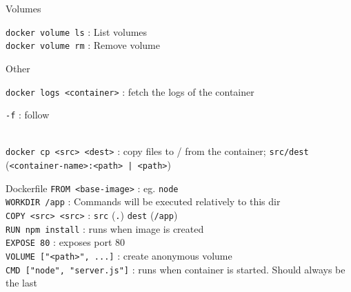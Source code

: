 \documentclass[10pt]{article}
\newcommand{\code}[1]{{\color{teal}\texttt{#1}}}
\newcommand{\cmd}[3][.3]{\code{#2} : #3 \\[#1em]}
\newcommand{\opts}[2][.5]{\hspace*{.5cm}\begin{minipage}{0.9\textwidth}
  #2
  \vspace*{-1em}
\end{minipage}\\[#1em]}
\newcommand{\cluster}[2]{\begin{mybox}{#1}
  #2
  \vspace*{-1.3em}
\end{mybox}}
\begin{document}
\begin{multicols*}{2}
  \cluster{Volumes}{
    \cmd{docker volume ls}{List volumes}
    \cmd{docker volume rm}{Remove volume}
  }

  \cluster{Other}{
    \cmd{docker logs <container>}{fetch the logs of the container}
    \opts{
      \code{-f} : follow \\
    }
    \cmd{docker cp <src> <dest>}{copy files to / from the container; \code{src/dest} (\code{<container-name>:<path> | <path>})}
  }

  \begin{mybox}{Dockerfile}
    \code{FROM <base-image>} : eg. \code{node}  \\[.3em]
    \code{WORKDIR /app} : Commands will be executed relatively to this dir \\[.3em]
    \code{COPY <src> <src>} : \code{src} (\code{.}) \code{dest} (\code{/app}) \\[.3em]
    \code{RUN npm install} : runs when image is created \\[.3em]
    \code{EXPOSE 80} : exposes port 80 \\[.3em]
    \code{VOLUME ["<path>", ...]} : create anonymous volume \\[.3em]
    \code{CMD ["node", "server.js"]} : runs when container is started. Should always be the last \\[.3em]
    \vspace*{-1.3em}
  \end{mybox}

\end{multicols*}
\end{document}
